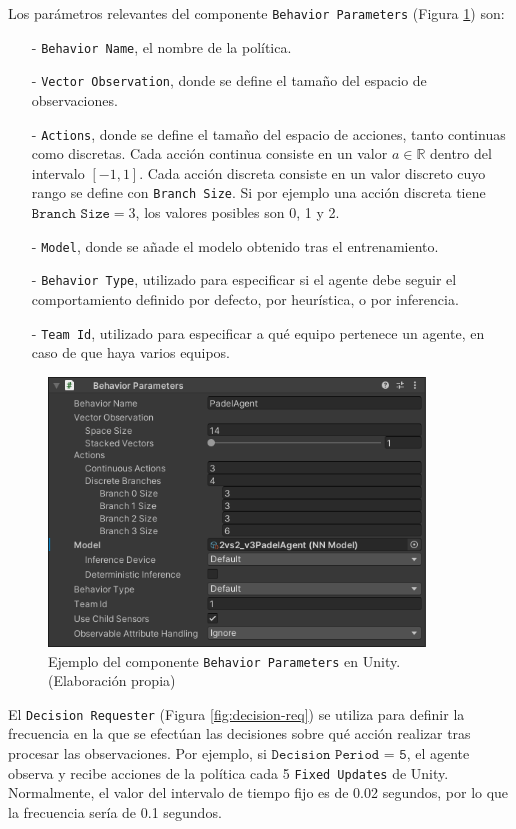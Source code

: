 Los parámetros relevantes del componente \texttt{Behavior Parameters} (Figura \ref{fig:behavior-param}) son:
\begin{enumerate}
    \item[-] \texttt{Behavior Name}, el nombre de la política.
    \item[-] \texttt{Vector Observation}, donde se define el tamaño del espacio de observaciones.
    \item[-] \texttt{Actions}, donde se define el tamaño del espacio de acciones, tanto continuas como discretas. Cada acción continua consiste en un valor $a \in \mathbb{R}$ dentro del intervalo $[-1, 1]$. Cada acción discreta consiste en un valor discreto cuyo rango se define con \texttt{Branch Size}. Si por ejemplo una acción discreta tiene $\texttt{Branch Size} = 3$, los valores posibles son 0, 1 y 2.
    \item[-] \texttt{Model}, donde se añade el modelo obtenido tras el entrenamiento.
    \item[-] \texttt{Behavior Type}, utilizado para especificar si el agente debe seguir el comportamiento definido por defecto, por heurística, o por inferencia.
    \item[-] \texttt{Team Id}, utilizado para especificar a qué equipo pertenece un agente, en caso de que haya varios equipos.
\end{enumerate}

\begin{figure}[H]
    \centering
    \includegraphics[width=10cm]{figures/behavior-param.png}
    \caption{Ejemplo del componente \texttt{Behavior Parameters} en Unity. (Elaboración propia)}
    \label{fig:behavior-param}
\end{figure}

El \texttt{Decision Requester} (Figura \ref{fig:decision-req}) se utiliza para definir la frecuencia en la que se efectúan las decisiones sobre qué acción realizar tras procesar las observaciones. Por ejemplo, si $\texttt{Decision Period = 5}$, el agente observa y recibe acciones de la política cada 5 \texttt{Fixed Updates} de Unity. Normalmente, el valor del intervalo de tiempo fijo es de 0.02 segundos, por lo que la frecuencia sería de 0.1 segundos.

